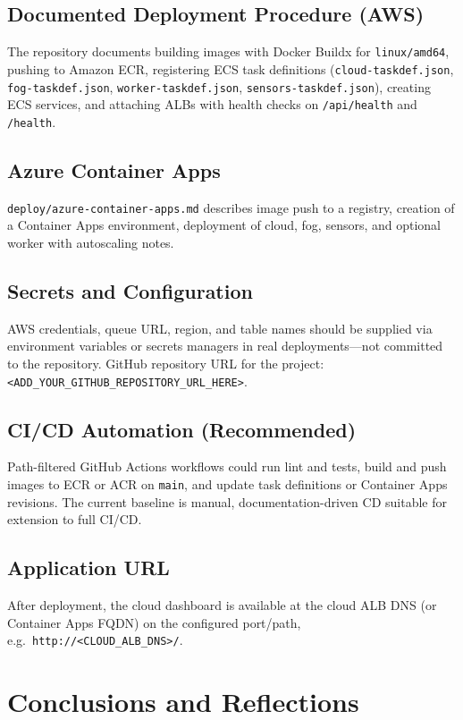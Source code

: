 \documentclass[conference]{IEEEtran}
\begin{document}
\subsection{Documented Deployment Procedure (AWS)}
The repository documents building images with Docker Buildx for \texttt{linux/amd64}, pushing to Amazon ECR, registering ECS task definitions (\texttt{cloud-taskdef.json}, \texttt{fog-taskdef.json}, \texttt{worker-taskdef.json}, \texttt{sensors-taskdef.json}), creating ECS services, and attaching ALBs with health checks on \texttt{/api/health} and \texttt{/health}.

\subsection{Azure Container Apps}
\texttt{deploy/azure-container-apps.md} describes image push to a registry, creation of a Container Apps environment, deployment of cloud, fog, sensors, and optional worker with autoscaling notes.

\subsection{Secrets and Configuration}
AWS credentials, queue URL, region, and table names should be supplied via environment variables or secrets managers in real deployments---not committed to the repository. GitHub repository URL for the project: \texttt{<ADD\_YOUR\_GITHUB\_REPOSITORY\_URL\_HERE>}.

\subsection{CI/CD Automation (Recommended)}
Path-filtered GitHub Actions workflows could run lint and tests, build and push images to ECR or ACR on \texttt{main}, and update task definitions or Container Apps revisions. The current baseline is manual, documentation-driven CD suitable for extension to full CI/CD.

\subsection{Application URL}
After deployment, the cloud dashboard is available at the cloud ALB DNS (or Container Apps FQDN) on the configured port/path, e.g.\ \texttt{http://<CLOUD\_ALB\_DNS>/}.

\section{Conclusions and Reflections}
\end{document}
